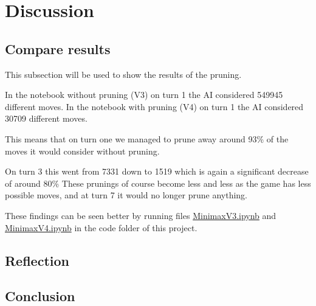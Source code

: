 \section{Discussion} 
\label{sec:Discussion}

\subsection{Compare results}
This subsection will be used to show the results of the pruning.

In the notebook without pruning (V3) on turn 1 the AI considered 549945 different moves.
In the notebook with pruning (V4) on turn 1 the AI considered 30709 different moves.

This means that on turn one we managed to prune away around 93\% of the moves it would consider without pruning.

On turn 3 this went from 7331 down to 1519 which is again a significant decrease of around 80\%
These prunings of course become less and less as the game has less possible moves, and at turn 7 it would no longer prune anything. 

These findings can be seen better by running files \href{code/TicTacToe_MinimaxV3.ipynb}{MinimaxV3.ipynb} and \href{code/TicTacToe_MinimaxV4.ipynb}{MinimaxV4.ipynb} in the code folder of this project.

\subsection{Reflection}

\subsection{Conclusion}

